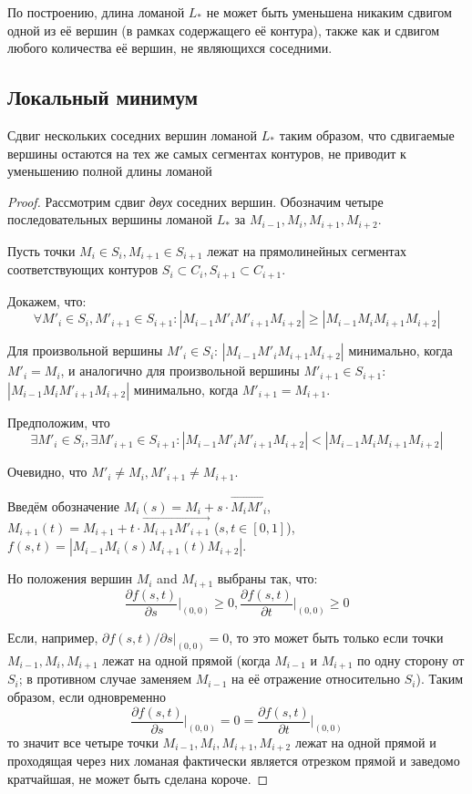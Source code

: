 \documentclass[10pt]{SPIIRAS_Proceedings}
\begin{document}
По построению,
длина ломаной
$L_*$
не может быть уменьшена никаким сдвигом
одной из её вершин
(в рамках содержащего её контура),
также как и сдвигом
любого количества её вершин,
не являющихся соседними.

\subsection{Локальный минимум}

\begin{proposition}
  Сдвиг нескольких соседних вершин ломаной
  $L_*$
  таким образом,
  что сдвигаемые вершины остаются на тех же самых сегментах
  контуров,
  не приводит к уменьшению полной длины ломаной
\end{proposition}

\begin{proof}
Рассмотрим сдвиг
\textit{двух}
соседних вершин.
Обозначим четыре последовательных вершины ломаной
$L_*$
за
$M_{i-1}, M_i, M_{i+1}, M_{i+2}$.

Пусть точки
$M_i \in S_i,
M_{i+1} \in S_{i+1}$
лежат на прямолинейных сегментах
соответствующих контуров
$S_i \subset C_i,
S_{i+1} \subset C_{i+1}$.

Докажем, что:
$$
\forall M'_i \in S_i,
M'_{i+1} \in S_{i+1}
:
|M_{i-1} M'_i M'_{i+1} M_{i+2}|
\geqslant
|M_{i-1} M_i M_{i+1} M_{i+2}|
$$

Для произвольной вершины
$M'_i \in S_i$:
$|M_{i-1} M'_i M_{i+1} M_{i+2}|$
минимально, когда
$M'_i=M_i$,
и аналогично
для произвольной вершины
$M'_{i+1} \in S_{i+1}$:
$|M_{i-1} M_i M'_{i+1} M_{i+2}|$
минимально, когда
$M'_{i+1}=M_{i+1}$.

Предположим, что
$$
\exists M'_i \in S_i,
\exists M'_{i+1} \in S_{i+1}
:
|M_{i-1} M'_i M'_{i+1} M_{i+2}|
<
|M_{i-1} M_i M_{i+1} M_{i+2}|
$$

Очевидно, что
$
M'_i \ne M_i,
M'_{i+1} \ne M_{i+1}
$.

Введём обозначение
$
M_i(s)=M_i+s \cdot \overrightarrow{M_i M'_i}
$,
$
 M_{i+1}(t)= M_{i+1}+t \cdot \overrightarrow{M_{i+1} M'_{i+1}}
$
($s,t \in[0,1]$),
$f(s,t)=
|M_{i-1} M_i(s) M_{i+1}(t) M_{i+2}|
$.

Но положения вершин
$M_i$ and $M_{i+1}$
выбраны так, что:
\begin{equation}
\frac{\partial f(s,t)}{\partial s} \Big|_{(0,0)} \geqslant 0,
\frac{\partial f(s,t)}{\partial t} \Big|_{(0,0)} \geqslant 0
\label{partials}
\end{equation}

Если,
например,
$\partial f(s,t) / \partial s \big|_{(0,0)} = 0$,
то это может быть только если точки
$M_{i-1}, M_i, M_{i+1}$
лежат на одной прямой
(когда
$M_{i-1}$
и
$M_{i+1}$
по одну сторону от
$S_i$;
в противном случае
заменяем
$M_{i-1}$
на её отражение относительно
$S_i$).
Таким образом,
если одновременно
$$
\frac{\partial f(s,t)}{\partial s} \Big|_{(0,0)}
= 0 =
\frac{\partial f(s,t)}{\partial t} \Big|_{(0,0)}
$$
то значит все четыре точки
$M_{i-1}, M_i, M_{i+1}, M_{i+2}$
лежат на одной прямой
и проходящая через них ломаная
фактически является отрезком прямой
и заведомо кратчайшая,
не может быть сделана короче.


\end{proof}
\end{document}
